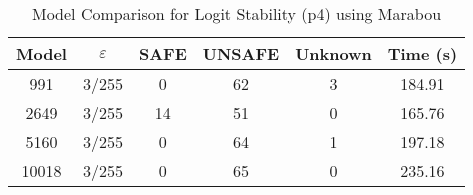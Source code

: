 \begin{table}[htbp]
\centering
\caption{Model Comparison for Logit Stability (p4) using Marabou}
\label{tab:p4_marabou_model_comparison}
\begin{tabular}{|c|c|c|c|c|c|}
\hline
Model & $\varepsilon$ & SAFE & UNSAFE & Unknown & Time (s) \\ \hline
991 & 3/255 & 0 & 62 & 3 & 184.91 \\ \hline
2649 & 3/255 & 14 & 51 & 0 & 165.76 \\ \hline
5160 & 3/255 & 0 & 64 & 1 & 197.18 \\ \hline
10018 & 3/255 & 0 & 65 & 0 & 235.16 \\ \hline
\end{tabular}
\end{table}
